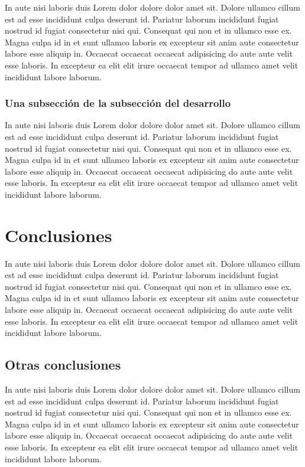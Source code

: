 \documentclass[11pt,letterpaper]{article}
\begin{document}
    In aute nisi laboris duis Lorem dolor dolore dolor amet sit. Dolore ullamco cillum est ad esse incididunt culpa deserunt id. Pariatur laborum incididunt fugiat nostrud id fugiat consectetur nisi qui. Consequat qui non et in ullamco esse ex. Magna culpa id in et sunt ullamco laboris ex excepteur sit anim aute consectetur labore esse aliquip in. Occaecat occaecat occaecat adipisicing do aute aute velit esse laboris. In excepteur ea elit elit irure occaecat tempor ad ullamco amet velit incididunt labore laborum.
    
    \subsubsection{Una subsección de la subsección del desarrollo}

	In aute nisi laboris duis Lorem dolor dolore dolor amet sit. Dolore ullamco cillum est ad esse incididunt culpa deserunt id. Pariatur laborum incididunt fugiat nostrud id fugiat consectetur nisi qui. Consequat qui non et in ullamco esse ex. Magna culpa id in et sunt ullamco laboris ex excepteur sit anim aute consectetur labore esse aliquip in. Occaecat occaecat occaecat adipisicing do aute aute velit esse laboris. In excepteur ea elit elit irure occaecat tempor ad ullamco amet velit incididunt labore laborum.
	
 \section{Conclusiones}
 
 	In aute nisi laboris duis Lorem dolor dolore dolor amet sit. Dolore ullamco cillum est ad esse incididunt culpa deserunt id. Pariatur laborum incididunt fugiat nostrud id fugiat consectetur nisi qui. Consequat qui non et in ullamco esse ex. Magna culpa id in et sunt ullamco laboris ex excepteur sit anim aute consectetur labore esse aliquip in. Occaecat occaecat occaecat adipisicing do aute aute velit esse laboris. In excepteur ea elit elit irure occaecat tempor ad ullamco amet velit incididunt labore laborum.
 	
 	\subsection{Otras conclusiones}
 	
 	In aute nisi laboris duis Lorem dolor dolore dolor amet sit. Dolore ullamco cillum est ad esse incididunt culpa deserunt id. Pariatur laborum incididunt fugiat nostrud id fugiat consectetur nisi qui. Consequat qui non et in ullamco esse ex. Magna culpa id in et sunt ullamco laboris ex excepteur sit anim aute consectetur labore esse aliquip in. Occaecat occaecat occaecat adipisicing do aute aute velit esse laboris. In excepteur ea elit elit irure occaecat tempor ad ullamco amet velit incididunt labore laborum.
\end{document}
